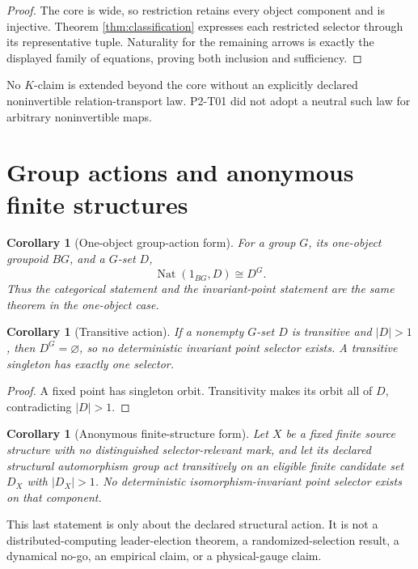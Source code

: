 \documentclass[11pt]{article}
\newtheorem{corollary}[theorem]{Corollary}
\theoremstyle{definition}
\newcommand{\Nat}{\operatorname{Nat}}
\begin{document}
\begin{proof}
The core is wide, so restriction retains every object component and is
injective. Theorem \ref{thm:classification} expresses each restricted
selector through its representative tuple. Naturality for the remaining
arrows is exactly the displayed family of equations, proving both inclusion
and sufficiency.
\end{proof}

No \(K\)-claim is extended beyond the core without an explicitly declared
noninvertible relation-transport law. P2-T01 did not adopt a neutral such law
for arbitrary noninvertible maps.

\section{Group actions and anonymous finite structures}

\begin{corollary}[One-object group-action form]
For a group \(G\), its one-object groupoid \(BG\), and a \(G\)-set \(D\),
\[
  \Nat(1_{BG},D)\cong D^G.
\]
Thus the categorical statement and the invariant-point statement are the
same theorem in the one-object case.
\end{corollary}

\begin{corollary}[Transitive action]
\label{cor:transitive}
If a nonempty \(G\)-set \(D\) is transitive and \(|D|>1\), then
\(D^G=\varnothing\), so no deterministic invariant point selector exists.
A transitive singleton has exactly one selector.
\end{corollary}

\begin{proof}
A fixed point has singleton orbit. Transitivity makes its orbit all of
\(D\), contradicting \(|D|>1\).
\end{proof}

\begin{corollary}[Anonymous finite-structure form]
Let \(X\) be a fixed finite source structure with no distinguished
selector-relevant mark, and let its declared structural automorphism group
act transitively on an eligible finite candidate set \(D_X\) with
\(|D_X|>1\). No deterministic isomorphism-invariant point selector exists
on that component.
\end{corollary}

This last statement is only about the declared structural action. It is not
a distributed-computing leader-election theorem, a randomized-selection
result, a dynamical no-go, an empirical claim, or a physical-gauge claim.
\end{document}
